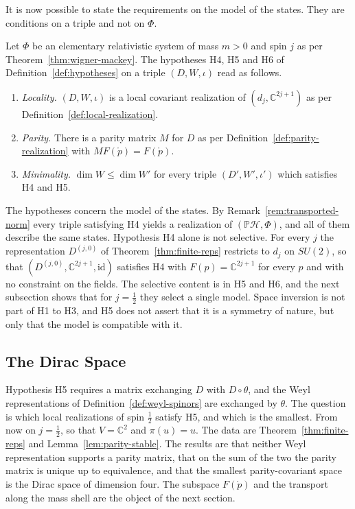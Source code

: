 \noindent It is now possible to state the requirements on the model of the states. They are conditions on a triple and not on $\Phi$.

\begin{definition}\label{def:locality-hypotheses}
	Let $\Phi$ be an elementary relativistic system of mass $m>0$ and spin $j$ as per Theorem~\ref{thm:wigner-mackey}. The hypotheses H4, H5 and H6 of Definition~\ref{def:hypotheses} on a triple $(D,W,\iota)$ read as follows.
	\begin{enumerate}
		\item[\textup{H4}] \emph{Locality.} $(D,W,\iota)$ is a local covariant realization of $(d_j,\mathbb{C}^{2j+1})$ as per Definition~\ref{def:local-realization}.
		\item[\textup{H5}] \emph{Parity.} There is a parity matrix $M$ for $D$ as per Definition~\ref{def:parity-realization} with $MF(\mathring{p})=F(\mathring{p})$.
		\item[\textup{H6}] \emph{Minimality.} $\dim W\leq\dim W'$ for every triple $(D',W',\iota')$ which satisfies H4 and H5.
	\end{enumerate}
\end{definition}

\begin{remark}[Scope of H4 to H6]\label{rem:locality-hypotheses}
	The hypotheses concern the model of the states. By Remark~\ref{rem:transported-norm} every triple satisfying H4 yields a realization of $(\mathbb{P}\mathcal{H},\Phi)$, and all of them describe the same states. Hypothesis H4 alone is not selective. For every $j$ the representation $D^{(j,0)}$ of Theorem~\ref{thm:finite-reps} restricts to $d_j$ on $SU(2)$, so that $(D^{(j,0)},\mathbb{C}^{2j+1},\mathrm{id})$ satisfies H4 with $F(p)=\mathbb{C}^{2j+1}$ for every $p$ and with no constraint on the fields. The selective content is in H5 and H6, and the next subsection shows that for $j=\frac12$ they select a single model. Space inversion is not part of H1 to H3, and H5 does not assert that it is a symmetry of nature, but only that the model is compatible with it.
\end{remark}

\subsection{The Dirac Space}
\label{subsec:dirac-space}

Hypothesis H5 requires a matrix exchanging $D$ with $D\circ\theta$, and the Weyl representations of Definition~\ref{def:weyl-spinors} are exchanged by $\theta$. The question is which local realizations of spin $\frac12$ satisfy H5, and which is the smallest. From now on $j=\frac12$, so that $V=\mathbb{C}^2$ and $\pi(u)=u$. The data are Theorem~\ref{thm:finite-reps} and Lemma~\ref{lem:parity-stable}. The results are that neither Weyl representation supports a parity matrix, that on the sum of the two the parity matrix is unique up to equivalence, and that the smallest parity-covariant space is the Dirac space of dimension four. The subspace $F(\mathring{p})$ and the transport along the mass shell are the object of the next section.

